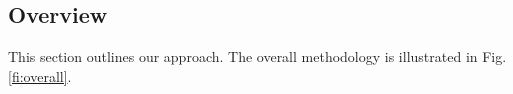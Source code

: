 
\subsection{Overview}

This section outlines our approach. The overall methodology is illustrated in Fig. \ref{fi:overall}.



\begin{figure*}
  \centering
  
  \caption{\textbf{Overall methodology}. The whole process consists of five major steps: (i) segmenting a video (ii) crafting static features, (iii) crafting motion features,
  (iv) fusing static and motion features, and (v) capturing temporal evolution of sub events. Static and motion features are independent
  and complementary. We generate static features based on  a pre-trained CNN and motion features based on 
  motion tubes, and capture the temporal evolution of sub events using an LSTM network.}

 \label{fi:overall}
\end{figure*}


